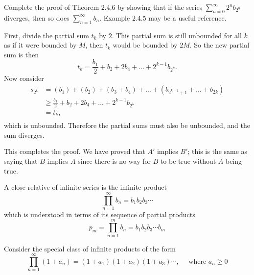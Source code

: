 \begin{exercise}
  Complete the proof of Theorem 2.4.6 by showing that if the series $\sum_{n=0}^{\infty} 2^{n} b_{2^{n}}$ diverges, then so does $\sum_{n=1}^{\infty} b_{n}$. Example $2.4.5$ may be a useful reference.
\end{exercise}

\begin{solution}
  First, divide the partial sum $t_k$ by $2$. This partial sum is still unbounded for all $k$ as if it were bounded by $M$, then $t_k$ would be bounded by $2M$. So the new partial sum is then $$t_k = \frac{b_1}{2} + b_2 + 2b_4 + \ldots + 2^{k-1}b_{2^k}.$$ Now consider 
  $$
  \begin{aligned}
  s_{2^k} 
  &= (b_1) + (b_2) + (b_3 + b_4) + \ldots + (b_{2^{k-1} + 1} + \ldots + b_{2k})\\
  &\geq \frac{b_1}{2} + b_2 + 2b_4 + \ldots + 2^{k-1}b_{2^k}\\
  &= t_k,\\
  \end{aligned}
  $$
  which is unbounded. Therefore the partial sums must also be unbounded, and the sum diverges.

  This completes the proof. We have proved that $A'$ implies $B'$; this is the same as saying that $B$ implies $A$ since there is no way for $B$ to be true without $A$ being true.
\end{solution}

\begin{exercise}
  A close relative of infinite series is the infinite product
  $$
  \prod_{n=1}^{\infty} b_{n}=b_{1} b_{2} b_{3} \cdots
  $$
  which is understood in terms of its sequence of partial products
  $$
  p_{m}=\prod_{n=1}^{m} b_{n}=b_{1} b_{2} b_{3} \cdots b_{m}
  $$

  Consider the special class of infinite products of the form
  $$
  \prod_{n=1}^{\infty}\left(1+a_{n}\right)=\left(1+a_{1}\right)\left(1+a_{2}\right)\left(1+a_{3}\right) \cdots, \quad \text { where } a_{n} \geq 0
  $$
\end{exercise}

